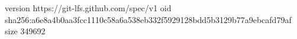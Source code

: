 version https://git-lfs.github.com/spec/v1
oid sha256:a6e8a4b0aa3fcc1110c58a6a538eb332f5929128bdd5b3129b77a9ebcafd79af
size 349692
